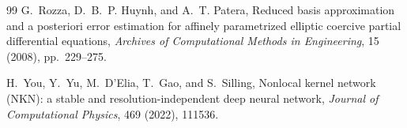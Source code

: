 \documentclass[11pt]{amsart}
\theoremstyle{remark}
\begin{document}
\begin{thebibliography}{99}
G.~Rozza, D.~B.~P. Huynh, and A.~T. Patera,
\newblock Reduced basis approximation and a posteriori error estimation for
affinely parametrized elliptic coercive partial differential equations,
\newblock \emph{Archives of Computational Methods in Engineering},
15 (2008), pp.~229--275.

H.~You, Y.~Yu, M.~D'Elia, T.~Gao, and S.~Silling,
\newblock Nonlocal kernel network (NKN): a stable and resolution-independent
deep neural network,
\newblock \emph{Journal of Computational Physics}, 469 (2022), 111536.

\end{thebibliography}
\end{document}
